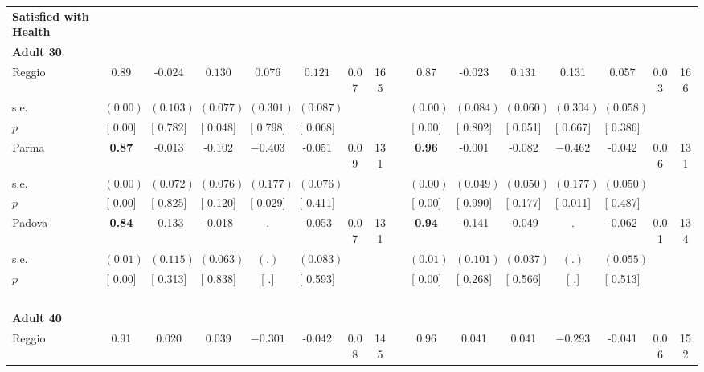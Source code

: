 \begin{longtable}{L{8em} c c c c c c c p{1em} c c c c c c c}
\textbf{Satisfied with Health} \\*
\quad \quad \textbf{Adult 30} & & & & & & & & & & & & & & & \\* 
\quad \quad \quad Reggio& 0.89 &    -0.024 & $ \mathbf{    0.130}$ &     0.076 & $ \mathbf{    0.121}$ &      0.07 &       165 & & 0.87 &    -0.023 & $ \mathbf{    0.131}$ &     0.131 &     0.057 &      0.03 &       166  \\*
\quad \quad \quad \quad s.e.& $ (     0.00)$ & $ (    0.103)$ & $ (    0.077)$ & $ (    0.301)$ & $ (    0.087)$ & & & & $ (     0.00)$ & $ (    0.084)$ & $ (    0.060)$ & $ (    0.304)$ & $ (    0.058)$ & &  \\*
\quad \quad \quad \quad $ p$ & [     0.00] & [    0.782] & [    0.048] & [    0.798] & [    0.068] & & & & [     0.00] & [    0.802] & [    0.051] & [    0.667] & [    0.386] & &  \\[1em]
\quad \quad \quad Parma& \textbf{     0.87} &    -0.013 &    -0.102 & $ \mathbf{   -0.403}$ &    -0.051 &      0.09 &       131 & & \textbf{     0.96} &    -0.001 &    -0.082 & $ \mathbf{   -0.462}$ &    -0.042 &      0.06 &       131  \\*
\quad \quad \quad \quad s.e.& $ (     0.00)$ & $ (    0.072)$ & $ (    0.076)$ & $ (    0.177)$ & $ (    0.076)$ & & & & $ (     0.00)$ & $ (    0.049)$ & $ (    0.050)$ & $ (    0.177)$ & $ (    0.050)$ & &  \\*
\quad \quad \quad \quad $ p$ & [     0.00] & [    0.825] & [    0.120] & [    0.029] & [    0.411] & & & & [     0.00] & [    0.990] & [    0.177] & [    0.011] & [    0.487] & &  \\[1em]
\quad \quad \quad Padova& \textbf{     0.84} &    -0.133 &    -0.018 &         . &    -0.053 &      0.07 &       131 & & \textbf{     0.94} &    -0.141 &    -0.049 &         . &    -0.062 &      0.01 &       134  \\*
\quad \quad \quad \quad s.e.& $ (     0.01)$ & $ (    0.115)$ & $ (    0.063)$ & $ (        .)$ & $ (    0.083)$ & & & & $ (     0.01)$ & $ (    0.101)$ & $ (    0.037)$ & $ (        .)$ & $ (    0.055)$ & &  \\*
\quad \quad \quad \quad $ p$ & [     0.00] & [    0.313] & [    0.838] & [        .] & [    0.593] & & & & [     0.00] & [    0.268] & [    0.566] & [        .] & [    0.513] & &  \\[1em]
~\\[1em]
\quad \quad \textbf{Adult 40} & & & & & & & & & & & & & & & \\* 
\quad \quad \quad Reggio& 0.91 &     0.020 &     0.039 & $ \mathbf{   -0.301}$ &    -0.042 &      0.08 &       145 & & 0.96 &     0.041 &     0.041 & $ \mathbf{   -0.293}$ &    -0.041 &      0.06 &       152  \\*

\end{longtable}
